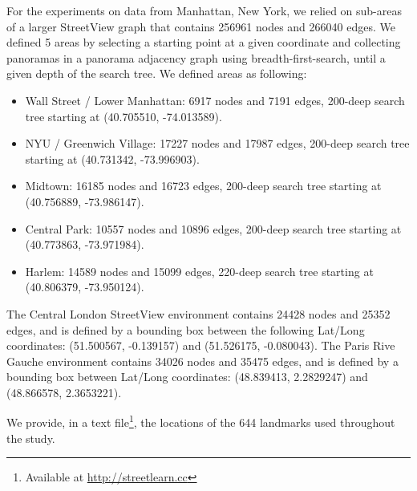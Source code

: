 For the experiments on data from Manhattan, New York, we relied on sub-areas of a larger StreetView graph that contains 256961 nodes and 266040 edges. We defined 5 areas by selecting a starting point at a given coordinate and collecting panoramas in a panorama adjacency graph using breadth-first-search, until a given depth of the search tree. We defined areas as following:

\begin{itemize}
    \item Wall Street / Lower Manhattan: 6917 nodes and 7191 edges, 200-deep search tree starting at (40.705510, -74.013589).
    \item NYU / Greenwich Village: 17227 nodes and 17987 edges, 200-deep search tree starting at (40.731342, -73.996903).
    \item Midtown: 16185 nodes and 16723 edges, 200-deep search tree starting at (40.756889, -73.986147).
    \item Central Park: 10557 nodes and 10896 edges, 200-deep search tree starting at (40.773863, -73.971984).
    \item Harlem: 14589 nodes and 15099 edges, 220-deep search tree starting at (40.806379, -73.950124).
\end{itemize}

The Central London StreetView environment contains 24428 nodes and 25352 edges, and is defined by a bounding box between the following Lat/Long coordinates: (51.500567, -0.139157) and (51.526175, -0.080043). The Paris Rive Gauche environment contains 34026 nodes and 35475 edges, and is defined by a bounding box between Lat/Long coordinates: (48.839413, 2.2829247) and (48.866578, 2.3653221).

We provide, in a text file\footnote{Available at \url{http://streetlearn.cc}}, the locations of the 644 landmarks used throughout the study.

